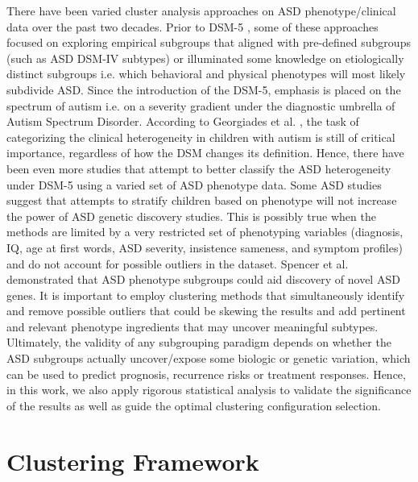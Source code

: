 \documentclass{bmcart}
\begin{document}
There have been varied cluster analysis approaches on ASD phenotype/clinical data over the past two decades. Prior to DSM-5 \cite{DSM}, some of these approaches \cite{stevens2000subgroups,ingram2008defining,cuccaro2012exploring} focused on exploring empirical subgroups that aligned with pre-defined subgroups (such as ASD DSM-IV subtypes) or illuminated some knowledge on etiologically distinct subgroups i.e. which behavioral and physical phenotypes will most likely subdivide ASD.  
Since the introduction of the DSM-5, emphasis is placed on the spectrum of autism i.e. on a severity gradient under the diagnostic umbrella of Autism Spectrum Disorder. According to Georgiades et al. \cite{georgiades2013importance}, the task of categorizing the clinical heterogeneity in children with autism is still of critical importance, regardless of how the DSM changes its definition. Hence, there have been even more studies \cite{georgiades2013investigating,ousley2014autism,veatch2014genetically,obafemi2015sorting,al2016ensemble,obafemi2018asd} that attempt to better classify the ASD heterogeneity under DSM-5 using a varied set of ASD phenotype data.
Some ASD studies \cite{chaste2015genome} suggest that attempts to stratify children based on phenotype will not increase the power of ASD genetic discovery studies. This is possibly true when the methods are limited by a very restricted set of phenotyping variables (diagnosis, IQ, age at first words, ASD severity, insistence sameness, and symptom profiles) and do not account for possible outliers in the dataset. Spencer et al. \cite{spencer2018heritable} demonstrated that ASD phenotype subgroups could aid discovery of novel ASD genes.
It is important to employ clustering methods that simultaneously identify and remove possible outliers that could be skewing the results and add pertinent and relevant phenotype ingredients that may uncover meaningful subtypes. Ultimately, the validity of any subgrouping paradigm depends on whether the ASD subgroups actually uncover/expose some biologic or genetic variation, which can be used to predict prognosis, recurrence risks or treatment responses. Hence, in this work, we also apply rigorous statistical analysis to validate the significance of the results as well as guide the optimal clustering configuration selection. 

\section*{Clustering Framework}
\label{sec:nbr}
\end{document}
